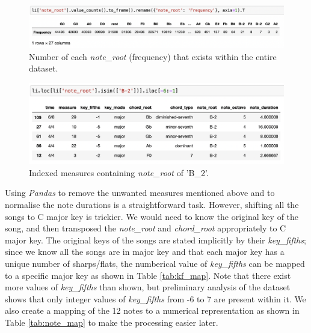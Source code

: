 \begin{figure}
    \centering
    \includegraphics[scale=0.5]{Figures/note frequency}
    \decoRule
    \caption{Number of each \emph{note\_root} (frequency) that exists within the entire dataset.}
    \label{fig:notefreq}
    \end{figure}
    
    \begin{figure}
        \centering
        \includegraphics[scale=0.5]{Figures/irregular notes}
        \decoRule
        \caption{Indexed measures containing \emph{note\_root} of 'B\_2'.}
        \label{fig:irregnote}
        \end{figure}
        
Using \emph{Pandas} to remove the unwanted measures mentioned above and to normalise the note durations is a straightforward task. However, shifting all the songs to C major key is trickier. We would need to know the original key of the song, and then transposed the \emph{note\_root} and \emph{chord\_root} appropriately to C major key. The original keys of the songs are stated implicitly by their \emph{key\_fifths}; since we know all the songs are in major key and that each major key has a unique number of sharps/flats, the numberical value of \emph{key\_fifths} can be mapped to a specific major key as shown in Table \ref{tab:kf_map}. Note that there exist more values of \emph{key\_fifths} than shown, but preliminary analysis of the dataset shows that only integer values of \emph{key\_fifths} from -6 to 7 are present within it. We also create a mapping of the 12 notes to a numerical representation as shown in Table \ref{tab:note_map} to make the processing easier later.

